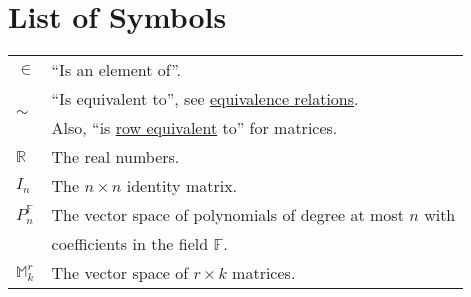 
\chapter{List of Symbols}

\begin{center}%
\begin{tabular}{ll}
$\in $ & ``Is an element of''.\\[2mm]
\multirow{2}{*}{$\sim$} & ``Is equivalent to'', see \hyperlink{equivalence}{equivalence relations}.\\
&Also, ``is \hyperlink{roweq}{row equivalent} to'' for matrices.\\[2mm]
${\mathbb R}$ & The real numbers.\\[2mm]
$I_n$ & The $n \times n$ identity matrix.\\[2mm]
$P_n^{\mathbb{F}}$ & The vector space of polynomials of degree at most $n$ with \\
 & coefficients in the field $\mathbb{F}$.\\[2mm]
${\mathbb M}_k^r$ & The vector space of $r\times k$ matrices.
\end{tabular}
\end{center}

\newpage
